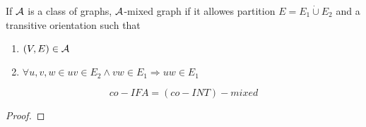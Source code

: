 \begin{definition}
	If $\operatorname{\mathcal{A}}$ is a class of graphs, $\operatorname{\mathcal{A}}$-mixed graph if it allowes partition $E = E_1 \dot{\cup} E_2$ and a transitive orientation such that
	\begin{enumerate}
		\item $(V, E) \in \operatorname{\mathcal{A}}$
		\item $\forall u, v, w \in uv \in E_2 \land vw \in E_1 \Rightarrow uw \in E_1$
	\end{enumerate}
\end{definition}

\begin{theorem}[Complements]
	\[ co-IFA = (co-INT)-mixed \]
\end{theorem}
\begin{proof}
\end{proof}
